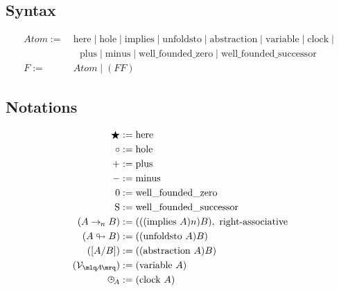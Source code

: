\documentclass{article}
\begin{document}
  \subsection{Syntax}
  \begin{align*}
     Atom :=&\ \mathrm{here} \mid \mathrm{hole} \mid \mathrm{implies} \mid \mathrm{unfoldsto} \mid \mathrm{abstraction} \mid \mathrm{variable} \mid \mathrm{clock} \mid\\
      &\ \ \ \ \mathrm{plus} \mid \mathrm{minus} \mid \mathrm{well\_founded\_zero} \mid \mathrm{well\_founded\_successor}\\
     F :=&\ Atom \mid (F F)
  \end{align*}

  \subsection{Notations}
  

  \newcommand{\ic}[1]{#1}
  \newcommand{\here}{\bigstar}
  \newcommand{\hole}{\circ}
  \newcommand{\wfz}{0}
  \newcommand{\wfsucc}{\operatorname{\mathrm{S}}}

  \renewcommand{\implies}[1]{\rightarrow_{\hspace{-0.04em}#1}}
  \newcommand{\proven}[1]{\vdash #1}
  \newcommand{\wellfounded}{\operatorname{\mathrm{well\_founded}}}
  \newcommand{\unfoldsto}{\looparrowright}
  \newcommand{\abst}[2]{[#1/#2]}
  \newcommand{\context}[2]{\mlq#1/#2\mrq}
  \newcommand{\variable}[1]{{\mathcal{V}_{\mlq\hspace{-0.06em}#1\hspace{-0.06em}\mrq}}}
  \newcommand{\clocksub}[1]{\text{\clock}_{\!#1}}
  \newcommand{\nameabst}[1]{#1 \Rightarrow}
  \newcommand{\axiom}[2]{#1 := #2}
  \newcommand{\axiomatic}[1]{\infty #1}

  \begin{align*}
    \here &:= \mathrm{here}\\
    \hole &:= \mathrm{hole}\\
    + &:= \mathrm{plus}\\
    - &:= \mathrm{minus}\\
    \wfz &:= \mathrm{well\_founded\_zero}\\
    \wfsucc &:= \mathrm{well\_founded\_successor}\\
    (A \implies{n} B) &:= (((\mathrm{implies}\ A) n) B),\ \operatorname{right-associative}\\
    (A \unfoldsto B) &:= ((\mathrm{unfoldsto}\ A) B)\\
    (\abst{A}{B}) &:= ((\mathrm{abstraction}\ A) B)\\
    (\variable{A}) &:= (\mathrm{variable}\ A)\\
    \clocksub{A} &:= (\mathrm{clock}\ A)\\
  \end{align*}
\end{document}
